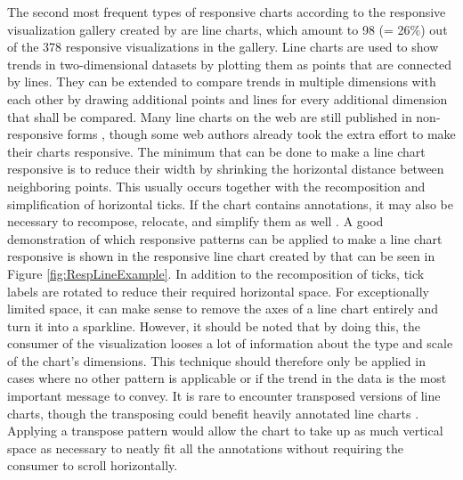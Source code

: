 The second most frequent types of responsive charts according to the responsive visualization gallery created by \cite{DesignPatternsTradeOffsRespVis} are line charts, which amount to 98 (= 26\%) out of the 378 responsive visualizations in the gallery. Line charts are used to show trends in two-dimensional datasets by plotting them as points that are connected by lines. They can be extended to compare trends in multiple dimensions with each other by drawing additional points and lines for every additional dimension that shall be compared. Many line charts on the web are still published in non-responsive forms \parencite{HLine,HLine2}, though some web authors already took the extra effort to make their charts responsive. The minimum that can be done to make a line chart responsive is to reduce their width \parencite{RespRadialScatterHLine} by shrinking the horizontal distance between neighboring points. This usually occurs together with the recomposition and simplification of horizontal ticks. If the chart contains annotations, it may also be necessary to recompose, relocate, and simplify them as well \parencite{RespHLines,RespHLine,RespHBarHLine,RespHLineHStackedBar}. A good demonstration of which responsive patterns can be applied to make a line chart responsive is shown in the responsive line chart created by \cite{RespVis} that can be seen in Figure \ref{fig:RespLineExample}. In addition to the recomposition of ticks, tick labels are rotated to reduce their required horizontal space. For exceptionally limited space, it can make sense to remove the axes of a line chart entirely and turn it into a sparkline. However, it should be noted that by doing this, the consumer of the visualization looses a lot of information about the type and scale of the chart's dimensions. This technique should therefore only be applied in cases where no other pattern is applicable or if the trend in the data is the most important message to convey. It is rare to encounter transposed versions of line charts, though the transposing could benefit heavily annotated line charts \parencite{VLine}. Applying a transpose pattern would allow the chart to take up as much vertical space as necessary to neatly fit all the annotations without requiring the consumer to scroll horizontally.

